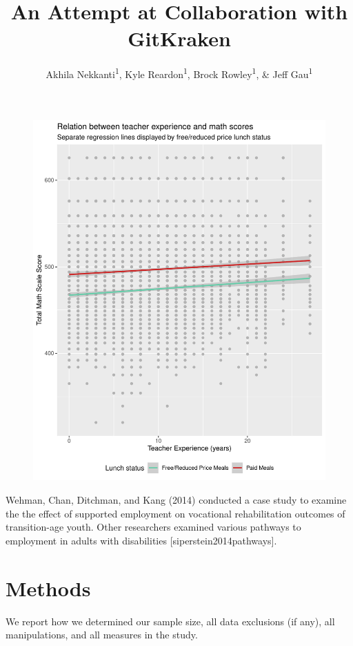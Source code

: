 \documentclass[man]{apa6}
\title{An Attempt at Collaboration with GitKraken}
\author{Akhila Nekkanti\textsuperscript{1}, Kyle Reardon\textsuperscript{1},
Brock Rowley\textsuperscript{1}, \& Jeff Gau\textsuperscript{1}}
\date{}
\affiliation{
\vspace{0.5cm}
\textsuperscript{1} University of Oregon}
\begin{document}
\maketitle

\begin{figure}
\centering
\includegraphics{Lab_8_files/figure-latex/import_data-1.pdf}
\caption{}
\end{figure}

Wehman, Chan, Ditchman, and Kang (2014) conducted a case study to
examine the the effect of supported employment on vocational
rehabilitation outcomes of transition-age youth. Other researchers
examined various pathways to employment in adults with disabilities
{[}siperstein2014pathways{]}.

\section{Methods}\label{methods}

We report how we determined our sample size, all data exclusions (if
any), all manipulations, and all measures in the study.
\end{document}
